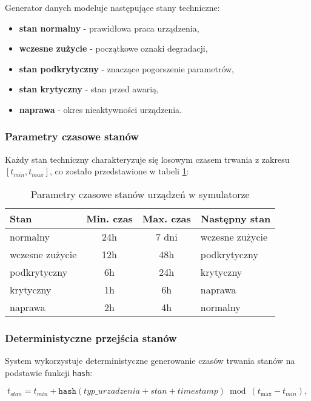 Generator danych modeluje następujące stany techniczne:

\begin{itemize}
    \item \textbf{stan normalny} - prawidłowa praca urządzenia,
    \item \textbf{wczesne zużycie} - początkowe oznaki degradacji,
    \item \textbf{stan podkrytyczny} - znaczące pogorszenie parametrów,
    \item \textbf{stan krytyczny} - stan przed awarią,
    \item \textbf{naprawa} - okres nieaktywności urządzenia.
\end{itemize}

\subsubsection{Parametry czasowe stanów}

Każdy stan techniczny charakteryzuje się losowym czasem trwania z zakresu $[t_{min}, t_{max}]$, co zostało przedstawione w tabeli \ref{tab:parametry_stanow_sim}:

\begin{table}[h]
\centering
\begin{tabular}{|l|c|c|l|}
\hline
\textbf{Stan} & \textbf{Min. czas} & \textbf{Max. czas} & \textbf{Następny stan} \\
\hline
normalny & 24h & 7 dni & wczesne zużycie \\
wczesne zużycie & 12h & 48h & podkrytyczny \\
podkrytyczny & 6h & 24h & krytyczny \\
krytyczny & 1h & 6h & naprawa \\
naprawa & 2h & 4h & normalny \\
\hline
\end{tabular}
\caption{Parametry czasowe stanów urządzeń w symulatorze}
\label{tab:parametry_stanow_sim}
\end{table}

\newpage

\subsubsection{Deterministyczne przejścia stanów}

System wykorzystuje deterministyczne generowanie czasów trwania stanów na podstawie funkcji \texttt{hash}:

$$t_{stan} = t_{min} + \texttt{hash}(typ\_urzadzenia + stan + timestamp) \bmod (t_{\text{max}} - t_{min}),$$


